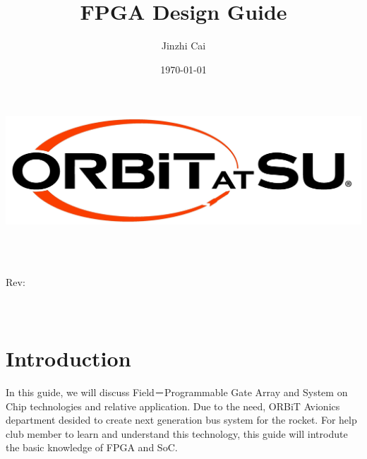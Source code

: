 \documentclass[12pt,article]{memoir}
\title{FPGA Design Guide}
\author{Jinzhi Cai}
\date{\today}
\makeatletter
\newcommand\@itemcode{}
\newcommand\@revnumber{}
\makeatother
\begin{document}

\makeatletter
	\includegraphics[width=\textwidth]{logo.jpg}\\[4ex]
	\begin{center}
	{\fontsize{50}{60}\selectfont \bfseries  \@title }\\[2ex] 
	{\LARGE  \@itemcode}\\
	\end{center}
	\begin{flushright}
	\vspace*{\fill}
	{\LARGE Rev: \@revnumber}\\[2ex]
	{\large \@author}\\[2ex]
	{\large \@date}\\[20ex]
	\end{flushright}
\makeatother
\thispagestyle{empty}
\newpage

\tableofcontents*
\thispagestyle{fancy}
\newpage


\chapter{Introduction}
In this guide, we will discuss Field－Programmable Gate Array and System on Chip technologies and relative application. Due to the need, ORBiT Avionics department desided to create next generation bus system for the rocket. For help club member to learn and understand this technology, this guide will introdute the basic knowledge of FPGA and SoC.
\end{document}
